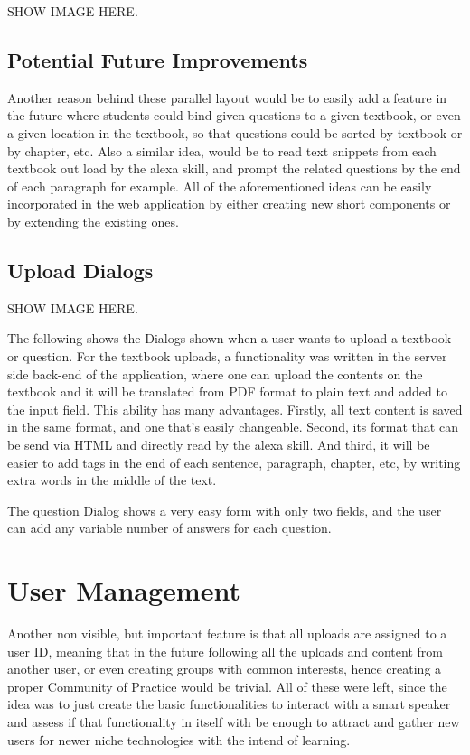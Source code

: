 SHOW IMAGE HERE.

\subsection{Potential Future Improvements}
Another reason behind these parallel layout would be to easily add a feature in the future
where students could bind given questions to a given textbook, or even a given location
in the textbook, so that questions could be sorted by textbook or by chapter, etc.
Also a similar idea, would be to read text snippets from each textbook out load 
by the alexa skill, and prompt the related questions by the end of each paragraph for
example. All of the aforementioned ideas can be easily incorporated in the web application
by either creating new short components or by extending the existing ones.


\subsection{Upload Dialogs}

SHOW IMAGE HERE.

The following shows the Dialogs shown when a user wants to upload a textbook or question.
For the textbook uploads, a functionality was written in the server side back-end of
the application, where one can upload the contents on the textbook and it will be 
translated from PDF format to plain text and added to the input field. This ability
has many advantages. Firstly, all text content is saved in the same format, and one
that's easily changeable. Second, its format that can be send via HTML and directly
read by the alexa skill. And third, it will be easier to add tags in the end of each 
sentence, paragraph, chapter, etc, by writing extra words in the middle of the text.

The question Dialog shows a very easy form with only two fields, and the user can add 
any variable number of answers for each question.

\section{User Management}

Another non visible, but important feature is that all uploads are assigned to a user ID, 
meaning that in the future following all the uploads and content from another user, or
even creating groups with common interests, hence creating a proper Community of Practice
would be trivial. All of these were left, since the idea was to just create the basic 
functionalities to interact with a smart speaker and assess if that functionality in itself
with be enough to attract and gather new users for newer niche technologies with the
intend of learning.


